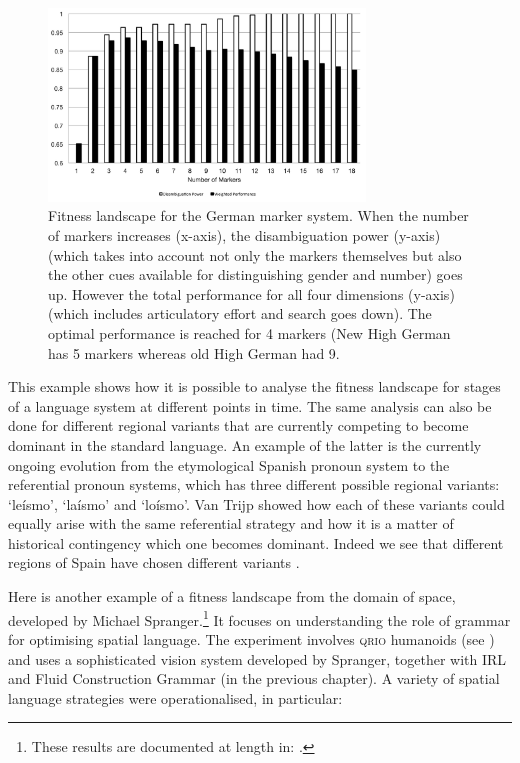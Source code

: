 \begin{figure}[htb!]
\centerline{
\includegraphics[width=0.75\textwidth]{chap12/figs/niche.pdf}
}
\caption{{Fitness landscape for the German marker system. When the number of markers increases (x-axis), the disambiguation 
power (y-axis) (which takes into account not only the markers themselves but also the other cues available for distinguishing 
gender and number) goes up. However the total performance for all four dimensions (y-axis) (which includes articulatory effort and 
search goes down). The optimal performance is reached for 4 markers (New High German has 5 markers whereas old High German had
9. \label{fig:german-system}}
} 
\end{figure} 

This example shows how it is possible to analyse the fitness landscape for stages of a language system at different points in 
time. The same analysis can also be done for different regional variants that are currently competing to become dominant 
in the standard language. An example of the latter is the currently ongoing evolution
from the etymological Spanish pronoun system to the referential pronoun systems, 
which has three different possible regional variants: `le\'ismo', `la\'ismo' and `lo\'ismo'. 
Van Trijp showed how each of these variants could equally arise with the same referential strategy and how it is 
a matter of historical contingency which one becomes dominant. Indeed we see that different regions of Spain
have chosen different variants \citep{VanTrijp:2010}. 

Here is another example of a fitness landscape from the domain of space, developed by 
Michael Spranger.\footnote{These results are documented at length in: \cite{Spranger:2014}.}
It focuses on understanding the role of grammar for optimising spatial language. 
The experiment involves \textsc{qrio} humanoids
(see ) and uses a 
sophisticated vision system developed by Spranger, together with IRL and Fluid 
Construction Grammar (in the previous chapter). A variety of spatial language strategies 
were operationalised, in particular: 


